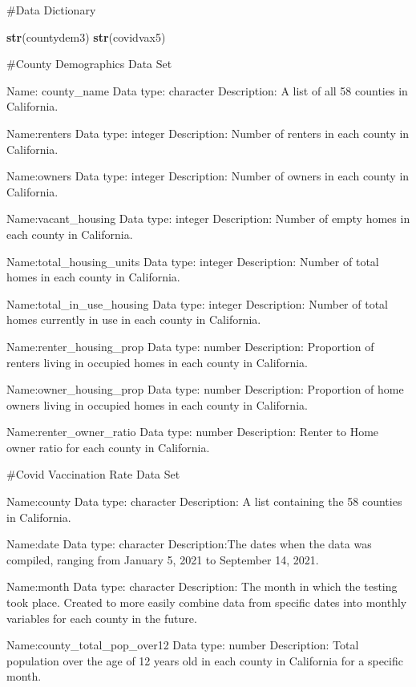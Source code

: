 \documentclass[
]{article}
\newenvironment{Shaded}{\begin{snugshade}}{\end{snugshade}}
\newcommand{\KeywordTok}[1]{\textcolor[rgb]{0.13,0.29,0.53}{\textbf{#1}}}
\newcommand{\NormalTok}[1]{#1}
\begin{document}
\newpage

\#Data Dictionary

\begin{Shaded}
\begin{Highlighting}[]
\KeywordTok{str}\NormalTok{(countydem3)}
\KeywordTok{str}\NormalTok{(covidvax5)}
\end{Highlighting}
\end{Shaded}

\#County Demographics Data Set

Name: county\_name Data type: character Description: A list of all 58
counties in California.

Name:renters Data type: integer Description: Number of renters in each
county in California.

Name:owners Data type: integer Description: Number of owners in each
county in California.

Name:vacant\_housing Data type: integer Description: Number of empty
homes in each county in California.

Name:total\_housing\_units Data type: integer Description: Number of
total homes in each county in California.

Name:total\_in\_use\_housing Data type: integer Description: Number of
total homes currently in use in each county in California.

Name:renter\_housing\_prop Data type: number Description: Proportion of
renters living in occupied homes in each county in California.

Name:owner\_housing\_prop Data type: number Description: Proportion of
home owners living in occupied homes in each county in California.

Name:renter\_owner\_ratio Data type: number Description: Renter to Home
owner ratio for each county in California.

\newpage

\#Covid Vaccination Rate Data Set

Name:county Data type: character Description: A list containing the 58
counties in California.

Name:date Data type: character Description:The dates when the data was
compiled, ranging from January 5, 2021 to September 14, 2021.

Name:month Data type: character Description: The month in which the
testing took place. Created to more easily combine data from specific
dates into monthly variables for each county in the future.

Name:county\_total\_pop\_over12 Data type: number Description: Total
population over the age of 12 years old in each county in California for
a specific month.
\end{document}

